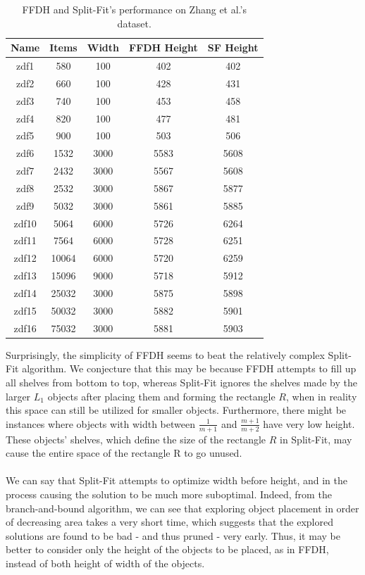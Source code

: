\documentclass{article}
\begin{document}
\begin{table}[!h]
\centering
\begin{tabular}{|c|c|c|c|c|}
\hline Name & Items & Width & FFDH Height & SF Height \\
\hline zdf1 & 580 & 100 & 402 & 402 \\
\hline zdf2 & 660 & 100 & 428 & 431 \\
\hline zdf3 & 740 & 100 & 453 & 458 \\
\hline zdf4 & 820 & 100 & 477 & 481 \\
\hline zdf5 & 900 & 100 & 503 & 506 \\
\hline zdf6 & 1532 & 3000 & 5583 & 5608 \\
\hline zdf7 & 2432 & 3000 & 5567 & 5608 \\
\hline zdf8 & 2532 & 3000 & 5867 & 5877 \\
\hline zdf9 & 5032 & 3000 & 5861 & 5885 \\
\hline zdf10 & 5064 & 6000 & 5726 & 6264 \\
\hline zdf11 & 7564 & 6000 & 5728 & 6251 \\
\hline zdf12 & 10064 & 6000 & 5720 & 6259 \\
\hline zdf13 & 15096 & 9000 & 5718 & 5912 \\
\hline zdf14 & 25032 & 3000 & 5875 & 5898 \\
\hline zdf15 & 50032 & 3000 & 5882 & 5901 \\
\hline zdf16 & 75032 & 3000 & 5881 & 5903 \\
\hline
\end{tabular}
\caption{FFDH and Split-Fit's performance on Zhang et al.'s dataset.}
\label{table:zdftest}
\end{table}
\noindent
Surprisingly, the simplicity of FFDH seems to beat the relatively complex Split-Fit algorithm. We conjecture that this may be because FFDH attempts to fill up all shelves from bottom to top, whereas Split-Fit ignores the shelves made by the larger $L_1$ objects after placing them and forming the rectangle $R$, when in reality this space can still be utilized for smaller objects. Furthermore, there might be instances where objects with width between $\frac{1}{m+1}$ and $\frac{m+1}{m+2}$ have very low height. These objects' shelves, which define the size of the rectangle $R$ in Split-Fit, may cause the entire space of the rectangle R to go unused.\\
\\
We can say that Split-Fit attempts to optimize width before height, and in the process causing the solution to be much more suboptimal. Indeed, from the branch-and-bound algorithm, we can see that exploring object placement in order of decreasing area takes a very short time, which suggests that the explored solutions are found to be bad - and thus pruned - very early. Thus, it may be better to consider only the height of the objects to be placed, as in FFDH, instead of both height of width of the objects.
\end{document}
